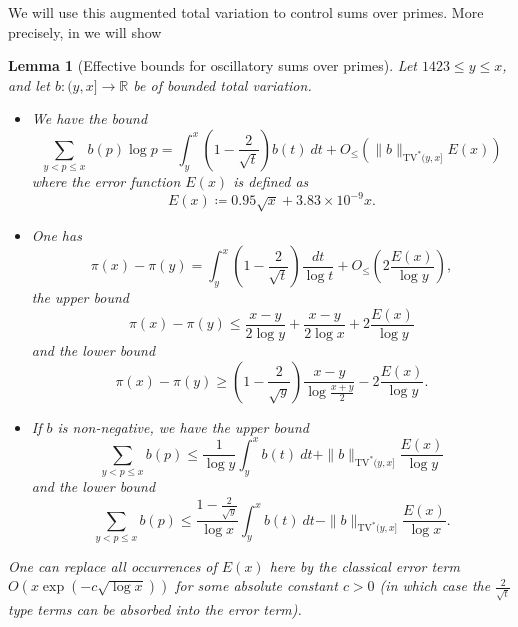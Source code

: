 \documentclass[10pt,a4paper,reqno]{amsart}
\numberwithin{equation}{section}
\theoremstyle{plain}
\newtheorem{lemma}[lemma]{Lemma}
\theoremstyle{definition}
\newcommand\R{\mathbb{R}}
\begin{document}
We will use this augmented total variation to control sums over primes.  More precisely, in  we will show

\begin{lemma}[Effective bounds for oscillatory sums over primes]\label{osc-lemma}  Let $1423 \leq y \leq x$, and let $b: (y,x] \to \R$ be of bounded total variation.
  \begin{itemize}
    \item [(i)] We have the bound
\begin{equation}\label{bv-exact}
    \sum_{y < p \leq x} b(p) \log p = \int_y^x \left(1-\frac{2}{\sqrt{t}}\right) b(t)\ dt + O_{\leq}(\|b\|_{\mathrm{TV}^*(y,x]} E(x))
\end{equation}
where the error function $E(x)$ is defined as
\begin{equation}\label{tilde-e}
  E(x) \coloneqq 0.95 \sqrt{x} + 3.83 \times 10^{-9} x.
\end{equation}
  \item[(ii)] One has
\begin{equation}\label{pix}
  \pi(x) - \pi(y) = \int_y^x \left(1-\frac{2}{\sqrt{t}}\right)\frac{dt}{\log t} + O_\leq\left(2 \frac{E(x)}{\log y}\right),
\end{equation}
the upper bound
\begin{equation}\label{pixy-upper}
 \pi(x) - \pi(y) \leq \frac{x-y}{2\log y} + \frac{x-y}{2\log x} + 2 \frac{E(x)}{\log y}
\end{equation}
and the lower bound
\begin{equation}\label{pixy-lower}
  \pi(x) - \pi(y) \geq \left(1-\frac{2}{\sqrt{y}}\right) \frac{x-y}{\log \frac{x+y}{2}} - 2 \frac{E(x)}{\log y}.
\end{equation}
  \item[(iii)] If $b$ is non-negative, we have the upper bound
\begin{equation}\label{bv-upper}
   \sum_{y < p \leq x} b(p) \leq \frac{1}{\log y} \int_y^x b(t)\ dt + \|b\|_{\mathrm{TV}^*(y,x]} \frac{E(x)}{\log y}
\end{equation}
and the lower bound
\begin{equation}\label{bv-lower}
  \sum_{y < p \leq x} b(p) \leq \frac{1-\frac{2}{\sqrt{y}}}{\log x} \int_y^x b(t)\ dt - \|b\|_{\mathrm{TV}^*(y,x]} \frac{E(x)}{\log x}.
\end{equation}
\end{itemize}
One can replace all occurrences of $E(x)$ here by the classical error term $O(x \exp(-c \sqrt{\log x}))$ for some absolute constant $c>0$ (in which case the $\frac{2}{\sqrt{t}}$ type terms can be absorbed into the error term).
\end{lemma}
\end{document}
